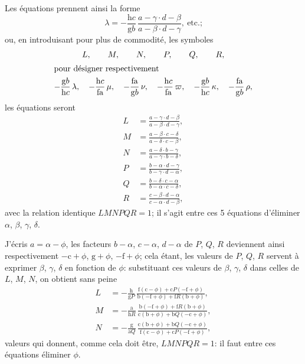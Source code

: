 \documentclass[11pt,a4paper]{book}
\begin{document}
Les \'equations prennent ainsi la forme
\[
\lambda=-\frac{\mathrm{h}c}{\mathrm{g}b}\,\frac{a-\gamma\cdot d-\beta}{a-\beta\cdot d-\gamma},\ \text{etc.;}
\]
ou, en introduisant pour plus de commodit\'e, les symboles
\begin{gather*}
L,\qquad M,\qquad N,\qquad P,\qquad Q,\qquad R,\\
\intertext{pour d\'esigner respectivement}
-\frac{\mathrm{g}b}{\mathrm{h}c}\,\lambda,\quad
-\frac{\mathrm{h}c}{\mathrm{fa}}\,\mu,\quad
-\frac{\mathrm{fa}}{\mathrm{g}b}\,\nu,\quad
-\frac{\mathrm{h}c}{\mathrm{fa}}\,\varpi,\quad
-\frac{\mathrm{g}b}{\mathrm{h}c}\,\kappa,\quad
-\frac{\mathrm{fa}}{\mathrm{g}b}\,\rho,
\end{gather*}
les \'equations seront
\begin{align*}
L&=\frac{a-\gamma\cdot d-\beta}{a-\beta\cdot d-\gamma},\\
M&=\frac{a-\beta\cdot c-\delta}{a-\delta\cdot c-\beta},\\
N&=\frac{a-\delta\cdot b-\gamma}{a-\gamma\cdot b-\delta},\\
P&=\frac{b-\alpha\cdot d-\gamma}{b-\gamma\cdot d-\alpha},\\
Q&=\frac{b-\delta\cdot c-\alpha}{b-\alpha\cdot c-\delta},\\
R&=\frac{c-\beta\cdot d-\alpha}{c-\alpha\cdot d-\beta},
\end{align*}
avec la relation identique $LMNPQR=1$; il s'agit entre ces 5 \'equations d'\'eliminer $\alpha$, $\beta$, $\gamma$, $\delta$.

J'\'ecris $a=\alpha-\phi$, les facteurs $b-\alpha$, $c-\alpha$, $d-\alpha$ de $P$, $Q$, $R$ deviennent ainsi respectivement $-\mathrm{c}+\phi$, $\mathrm{g}+\phi$, $-\mathrm{f}+\phi$; cela \'etant, les valeurs de $P$, $Q$, $R$ servent \`a exprimer $\beta$, $\gamma$, $\delta$ en fonction de $\phi$: substituant ces valeurs de $\beta$, $\gamma$, $\delta$ dans celles de $L$, $M$, $N$, on obtient sans peine
\begin{align*}
L&=-\frac{\mathrm{h}}{\mathrm{g}P}\,
  \frac{\mathrm{f}(\mathrm{c}-\phi)+\mathrm{c}P(-\mathrm{f}+\phi)}
       {\mathrm{b}(-\mathrm{f}+\phi)+\mathrm{f}R(\mathrm{b}+\phi)},\\
M&=-\frac{\mathrm{a}}{\mathrm{h}R}\,
  \frac{\mathrm{b}(-\mathrm{f}+\phi)+\mathrm{f}R(\mathrm{b}+\phi)}
       {\mathrm{c}(\mathrm{b}+\phi)+\mathrm{b}Q(-\mathrm{c}+\phi)},\\
N&=-\frac{\mathrm{g}}{\mathrm{a}Q}\,
  \frac{\mathrm{c}(\mathrm{b}+\phi)+\mathrm{b}Q(-\mathrm{c}+\phi)}
       {\mathrm{f}(\mathrm{c}-\phi)+\mathrm{c}P(-\mathrm{f}+\phi)},
\end{align*}
valeurs qui donnent, comme cela doit \^etre, $LMNPQR=1$: il faut entre ces \'equations \'eliminer $\phi$.
\end{document}
